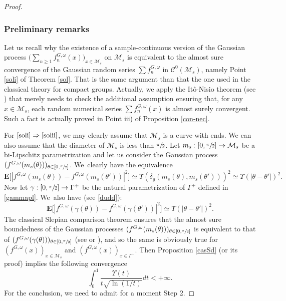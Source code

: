\documentclass[10pt]{amsart}
\theoremstyle{theorem}
\theoremstyle{definition}
\newcommand\E{\mathbf{E}}
\newcommand\CC{\mathcal{C}}
\begin{document}
\skpt
\begin{proof}\vspace*{-.5\baselineskip}
\subsubsection*{Preliminary remarks}
Let us recall why the existence of a sample-continuous version of the Gaussian process $\bigl(\sum_{n\geq 1}f_n^{G,\omega}(x)\bigr)_{x\in \mathcal{M}_s}$ on $\mathcal{M}_s$ is equivalent to the almost sure convergence of the Gaussian random series $\sum f_n^{G,\omega}$ in $\CC^0(\mathcal{M}_s)$, namely Point \eqref{soli} of Theorem \ref{sol}. That is the same argument than that the one used in the classical theory for compact groups. Actually, we apply the Itô-Nisio theorem (see \cite[p.\,238]{queff2}) that merely needs to check the additional assumption ensuring that, for any $x\in \mathcal{M}_s$, each random numerical series $\sum f_n^{G,\omega}(x)$ is almost surely convergent. Such a fact is actually proved in Point iii) of Proposition \ref{con-nec}.

 For $\eqref{soli}\Rightarrow\eqref{solii}$, we may clearly assume that $\mathcal{M}_s$ is a curve with ends. We can also assume that the diameter of $\mathcal{M}_s$ is less than $\sfrac{\pi}{2}$. Let $m_s: [0,\sfrac{\pi}{2}]\to \mathcal{M}_s$ be a bi-Lipschitz parametrization and let us consider the Gaussian process $(f^{G,\omega}(m_s(\theta)))_{\theta \in [0,\sfrac{\pi}{2}]}$. We~clearly have the equivalence
\begin{equation*}
\E\bigl[|f^{G,\omega}(m_s(\theta))-f^{G,\omega}(m_s(\theta'))|^2\bigr]\simeq \Upsilon(\delta_g(m_s(\theta),m_s(\theta')))^2\simeq \Upsilon(|\theta-\theta'|)^2.
\end{equation*}
Now let $\gamma:[0,\sfrac{\pi}{2}]\to \Gamma^{+}$ be the natural parametrization of $\Gamma^{+}$ defined in \eqref{gammapl}. We~also have (see \eqref{dudd}):
\begin{equation}\label{defSS}
\E\bigl[|f^{G,\omega}(\gamma(\theta))-f^{G,\omega}(\gamma(\theta'))|^2\bigr]\simeq \Upsilon(|\theta-\theta'|)^2.
\end{equation}
The classical Slepian comparison theorem ensures that the almost sure boundedness of the Gaussian processes $(f^{G,\omega}(m_s(\theta)))_{\theta \in [0,\sfrac{\pi}{2}]}$ is equivalent to that of
$(f^{G,\omega}(\gamma(\theta)))_{\theta\in [0,\sfrac{\pi}{2}]}$ (see \cite[Cor.\,3.14]{ledoux} or \cite[p.\,73]{queff2}), and so the same is obviously true for $(f^{G,\omega}(x))_{x\in \mathcal{M}_s}$ and $(f^{G,\omega}(x))_{x\in \Gamma^+}$. Then Proposition \ref{casSd} (or its proof) implies the following convergence
\begin{equation}\label{uup}
\int_{0}^1 \frac{\Upsilon(t)}{t\sqrt{\ln(1/t)}}dt <+\infty.
\end{equation}
For the conclusion, we need to admit for a moment Step 2.


\end{proof}
\end{document}
